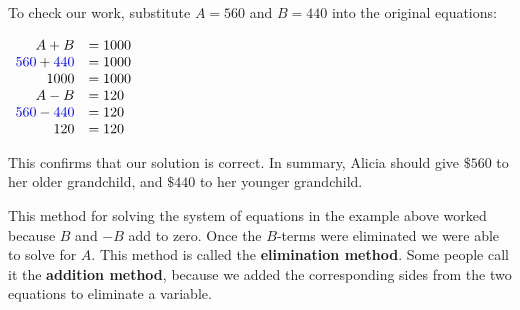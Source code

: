 \documentclass[nooutcomes]{ximera}
\begin{document}
\begin{example}
\begin{explanation}
 To check our work,
        substitute $A=560$ and $B=440$ into the original equations:
\begin{center}
$
\begin{array}{rl}
       A+B&=1000\\ 
          {\color{blue}{{560}}}+{\color{blue}{{440}}}&=1000\\
          1000&=1000\\
A-B&=120\\
{\color{blue}{{560}}}-{\color{blue}{{440}}}&=120\\
120&=120
\end{array}
$
\end{center}
        This confirms that our solution is correct.
        In summary, Alicia should give $\$560$ to her older grandchild,
        and $\$440$ to her younger grandchild.
        \end{explanation}
\end{example}

 This method for solving the system of equations in the example above
      worked because $B$ and $-B$ add to zero.
      Once the $B$-terms were eliminated we were able to solve for $A$.
      This method is called the \textbf{elimination method}.
      Some people call it the \textbf{addition method},
      because we added the corresponding sides from the two equations to eliminate a variable.
\end{document}
